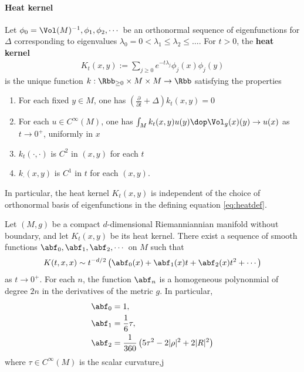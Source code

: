 \paragraph{Heat kernel}
Let $\phi_0=\Vol(M)^{-1},\phi_1,\phi_2,\cdots$ be an orthonormal sequence of eigenfunctions for $\Delta$ corresponding to eigenvalues $\lambda_0=0 <\lambda_1 \leq \lambda_2 \leq \dots$. For $t >0$, the \textbf{heat kernel}
\begin{align}\label{eq:heatdef}
    K_t(x,y):= \sum_{j\geq 0} e^{-t\lambda_j} \phi_j(x)\phi_j(y)
\end{align}
is the unique function $k:\Rbb_{\geq 0} \times M \times M \to \Rbb$ satisfying the properties
\begin{enumerate}
    \item For each fixed $y\in M$, one has $\left(\frac{\partial}{\partial t} + \Delta \right)k_t(x,y) = 0$
    \item For each $u\in C^\infty(M)$, one has $ \int_M k_t(x,y) u(y)  \dop \Vol_g (x)(y) \to u(x)$  as $t \to 0^+$, uniformly in $x$
    \item $k_t(\cdot,\cdot)$ is $C^2$ in $(x,y)$ for each $t$
    \item $k_\cdot( x,y)$ is $C^1$  in $t$ for each $(x,y)$.
\end{enumerate}
In particular, the heat kernel $K_t(x,y)$ is independent of the choice of orthonormal basis of eigenfunctions in the defining equation \ref{eq:heatdef}.

\begin{proposition}\label{prop:asymptoticExpansion}
    Let $(M,g)$ be a compact $d$-dimensional Riemanniannian manifold without boundary, and let $K_t(x,y)$ be its heat kernel.  There exist a sequence of smooth functions $\abf_0,\abf_1, \abf_2,\cdots$ on $M$ such that
    \begin{align}\label{eq:asymptoticExpansion}
        K(t,x,x) \sim t^{-d/2}\left(\abf_0(x)+ \abf_1(x) t + \abf_2(x) t^2 +\cdots  \right)
    \end{align}
    as $t \to 0^+$. For each $n$, the function $\abf_n$ is a homogeneous polynonmial of degree $2n$ in the derivatives of the metric $g$.
    In particular,
    \begin{align}
        \abf_0 & = 1,                                                       \\
        \abf_1 & =\frac{1}{6} \tau,                                         \\
        \abf_2 & =\frac{1}{360}\left( 5\tau^2 - 2 |\rho|^2 +2 |R|^2 \right)
    \end{align}
    where $\tau \in C^\infty(M)$ is the scalar curvature,j
\end{proposition}













\newpage








